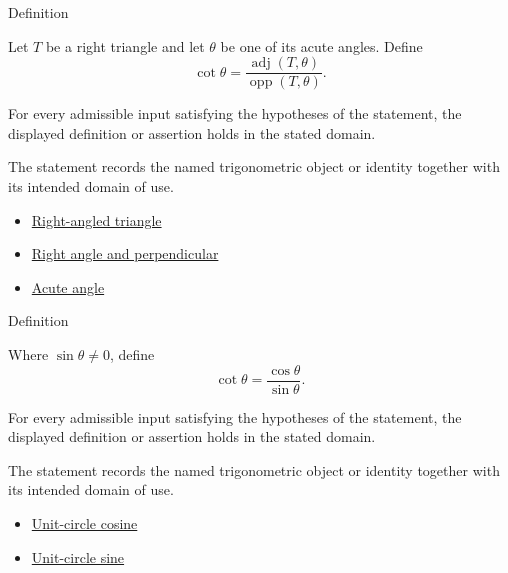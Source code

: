 

\begin{definitionbox}{Definition}
\begin{definition}
\label{def:right-triangle-cotangent}
Let $T$ be a right triangle and let $\theta$ be one of its acute angles. Define
\[
\cot\theta=\frac{\operatorname{adj}(T,\theta)}{\operatorname{opp}(T,\theta)}.
\]
\end{definition}
\end{definitionbox}
\begin{remark*}
For every admissible input satisfying the hypotheses of the statement, the
displayed definition or assertion holds in the stated domain.
\end{remark*}

\begin{remark*}[Interpretation]
The statement records the named trigonometric object or identity together with
its intended domain of use.
\end{remark*}

\begin{dependencies}
\begin{itemize}
  \item \hyperref[def:euclid-triangle-angle-classes]{Right-angled triangle}
  \item \hyperref[def:euclid-right-angle-and-perpendicular]{Right angle and perpendicular}
  \item \hyperref[def:euclid-acute-angle]{Acute angle}
\end{itemize}
\end{dependencies}



\begin{definitionbox}{Definition}
\begin{definition}
\label{def:extended-cotangent}
Where $\sin\theta\neq 0$, define
\[
  \cot\theta=\frac{\cos\theta}{\sin\theta}.
\]
\end{definition}
\end{definitionbox}
\begin{remark*}
For every admissible input satisfying the hypotheses of the statement, the
displayed definition or assertion holds in the stated domain.
\end{remark*}

\begin{remark*}[Interpretation]
The statement records the named trigonometric object or identity together with
its intended domain of use.
\end{remark*}

\begin{dependencies}
\begin{itemize}
  \item \hyperref[def:unit-circle-cosine]{Unit-circle cosine}
  \item \hyperref[def:unit-circle-sine]{Unit-circle sine}
\end{itemize}
\end{dependencies}
